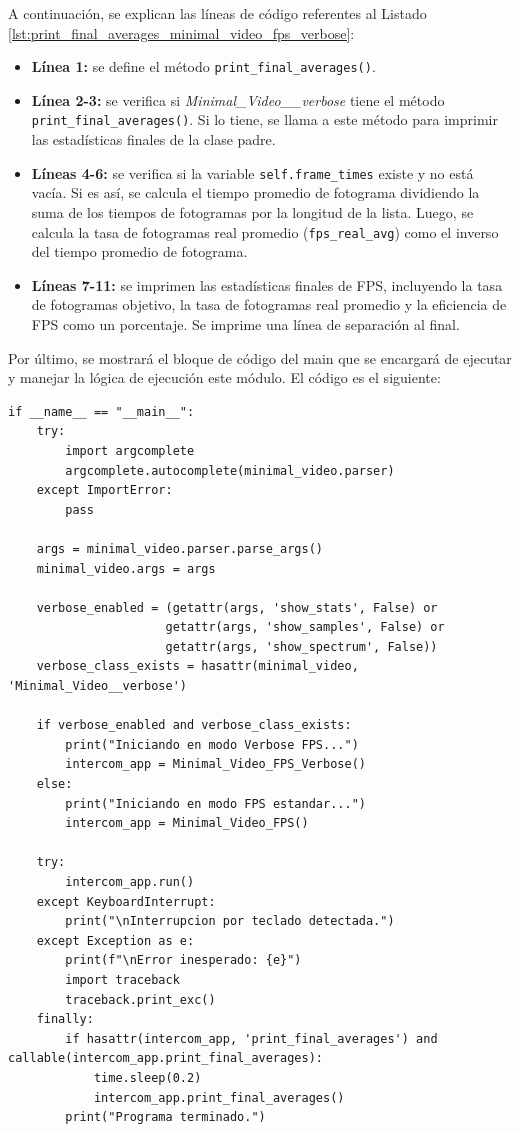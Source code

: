 A continuación, se explican las líneas de código referentes al Listado \ref{lst:print_final_averages_minimal_video_fps_verbose}:
\begin{itemize}
    \item \textbf{Línea 1:} se define el método \texttt{print\_final\_averages()}.
    \item \textbf{Línea 2-3:} se verifica si \textit{Minimal\_Video\_\_verbose} tiene el método \texttt{print\_final\_averages()}. Si lo tiene, se llama a este método para imprimir las estadísticas finales de la clase padre.
    \item \textbf{Líneas 4-6:} se verifica si la variable \texttt{self.frame\_times} existe y no está vacía. Si es así, se calcula el tiempo promedio de fotograma dividiendo la suma de los tiempos de fotogramas por la longitud de la lista. Luego, se calcula la tasa de fotogramas real promedio (\texttt{fps\_real\_avg}) como el inverso del tiempo promedio de fotograma.
    \item \textbf{Líneas 7-11:} se imprimen las estadísticas finales de FPS, incluyendo la tasa de fotogramas objetivo, la tasa de fotogramas real promedio y la eficiencia de FPS como un porcentaje. Se imprime una línea de separación al final.
\end{itemize}
\vspace{\baselineskip}

Por último, se mostrará el bloque de código del main que se encargará de ejecutar y manejar la lógica de ejecución este módulo. El código es el siguiente:
\begin{lstlisting}[style=pythonstyle, caption={Bloque de código del main de Minimal\_Video\_FPS.}, label={lst:main_fps}]
if __name__ == "__main__":
    try:
        import argcomplete
        argcomplete.autocomplete(minimal_video.parser)
    except ImportError:
        pass
    
    args = minimal_video.parser.parse_args()
    minimal_video.args = args
    
    verbose_enabled = (getattr(args, 'show_stats', False) or
                      getattr(args, 'show_samples', False) or
                      getattr(args, 'show_spectrum', False))
    verbose_class_exists = hasattr(minimal_video, 'Minimal_Video__verbose')
    
    if verbose_enabled and verbose_class_exists:
        print("Iniciando en modo Verbose FPS...")
        intercom_app = Minimal_Video_FPS_Verbose()
    else:
        print("Iniciando en modo FPS estandar...")
        intercom_app = Minimal_Video_FPS()

    try:
        intercom_app.run()
    except KeyboardInterrupt:
        print("\nInterrupcion por teclado detectada.")
    except Exception as e:
        print(f"\nError inesperado: {e}")
        import traceback
        traceback.print_exc()
    finally:
        if hasattr(intercom_app, 'print_final_averages') and callable(intercom_app.print_final_averages):
            time.sleep(0.2)
            intercom_app.print_final_averages()
        print("Programa terminado.")
\end{lstlisting}
\vspace{\baselineskip}

